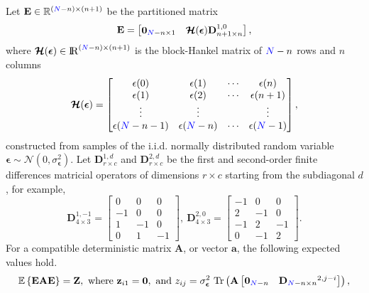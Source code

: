 \begin{lem} \label{lem:lemma1}
Let $\mathbf{E} \in \mathbb{R}^{\left(\color{blue}N\color{black}-n\right) \times \left(n+1\right)}$ be the partitioned matrix 
\[ \mathbf{E} = \begin{bmatrix} \mathbf{0}_{\color{blue}N\color{black}-n \times 1} & \bm{\mathcal{H}}(\bm{\epsilon}) \mathbf{D}_{n+1 \times n}^{1,0} \end{bmatrix}, \]
 where $\bm{\mathcal{H}}(\bm{\epsilon}) \in {\rm I\!R}^{\left(\color{blue}N\color{black}-n\right) \times \left(n+1\right)}$ is the block-Hankel matrix of $\color{blue}N\color{black}-n$ rows and $n$ columns
\[ \bm{\mathcal{H}}(\bm{\epsilon}) = \begin{bmatrix} \epsilon(0) & \epsilon(1) & \cdots & \epsilon(n) \\ \epsilon(1) & \epsilon(2) & \cdots & \epsilon(n+1) \\ \vdots & \vdots & & \vdots \\ \epsilon(\color{blue}N\color{black}-n-1) & \epsilon(\color{blue}N\color{black}-n) & \cdots & \epsilon(\color{blue}N\color{black}-1) \end{bmatrix} , \]
constructed from samples of the i.i.d. normally distributed random variable $\bm{\epsilon} \sim \mathcal{N}(0, \sigma_{\bm{\epsilon}}^2)$.
Let $\mathbf{D}_{r \times c}^{1,d}$ and $\mathbf{D}_{r \times c}^{2,d}$ be the first and second-order finite differences matricial operators of dimensions $r \times c$ starting from the subdiagonal $d$, for example, 
\[ \mathbf{D}_{4 \times 3}^{1,-1} = \begin{bmatrix} 0 & 0 & 0 \\ -1 & 0 & 0 \\ 1 & -1 & 0 \\ 0 & 1 & -1 \end{bmatrix}, \ \mathbf{D}_{4 \times 3}^{2,0} = \begin{bmatrix}-1 & 0 & 0 \\ 2 & -1 & 0 \\ - 1 & 2 & -1 \\ 0 & -1 & 2 \end{bmatrix} . \]
For a compatible deterministic matrix $\mathbf{A}$, or vector $\mathbf{a}$, the following expected values hold.
\begin{equation*} \begin{aligned} 
& \mathbb{E} \left\{ \mathbf{E} \mathbf{A} \mathbf{E} \right\} = \mathbf{Z}, \
\text{where} \ \mathbf{z}_{i1} = \mathbf{0}, \ \text{and} \ 
z_{ij} = \sigma_{\bm{\epsilon}}^2 \ \mathrm{Tr} \left( \mathbf{A} \begin{bmatrix} \mathbf{0}_{\color{blue}N\color{black}-n} & \mathbf{D}_{\color{blue}N\color{black}-n \times n}^{2, j-i} \end{bmatrix} \right), \\

\end{aligned}
\end{equation*}
\end{lem}
